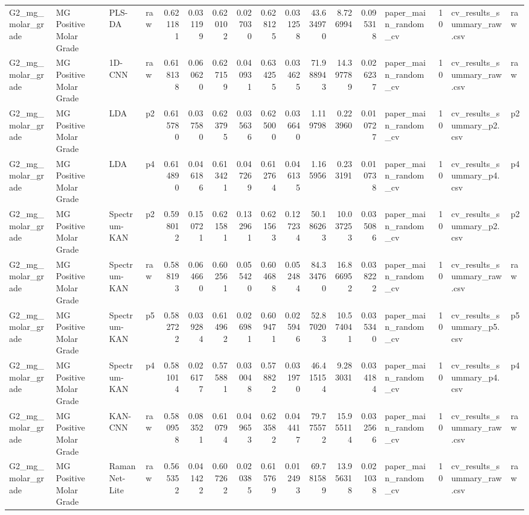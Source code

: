 \begin{tabular}{llllrrrrrrrrrlrll}
G2_mg_molar_grade & MG Positive Molar Grade & PLS-DA & raw & 0.621181 & 0.031199 & 0.620102 & 0.027030 & 0.628125 & 0.031258 & 43.634970 & 8.726994 & 0.095318 & paper_main_random_cv & 10 & cv_results_summary_raw.csv & raw \\
G2_mg_molar_grade & MG Positive Molar Grade & 1D-CNN & raw & 0.618138 & 0.060620 & 0.627159 & 0.040931 & 0.634255 & 0.034625 & 71.988943 & 14.397789 & 0.026237 & paper_main_random_cv & 10 & cv_results_summary_raw.csv & raw \\
G2_mg_molar_grade & MG Positive Molar Grade & LDA & p2 & 0.615780 & 0.037580 & 0.623795 & 0.035636 & 0.625000 & 0.036640 & 1.119798 & 0.223960 & 0.010727 & paper_main_random_cv & 10 & cv_results_summary_p2.csv & p2 \\
G2_mg_molar_grade & MG Positive Molar Grade & LDA & p4 & 0.614890 & 0.046186 & 0.613421 & 0.047269 & 0.612764 & 0.046135 & 1.165956 & 0.233191 & 0.010738 & paper_main_random_cv & 10 & cv_results_summary_p4.csv & p4 \\
G2_mg_molar_grade & MG Positive Molar Grade & Spectrum-KAN & p2 & 0.598012 & 0.150721 & 0.621581 & 0.132961 & 0.621563 & 0.127234 & 50.186263 & 10.037253 & 0.035086 & paper_main_random_cv & 10 & cv_results_summary_p2.csv & p2 \\
G2_mg_molar_grade & MG Positive Molar Grade & Spectrum-KAN & raw & 0.588193 & 0.064660 & 0.602561 & 0.055420 & 0.604688 & 0.052484 & 84.334760 & 16.866952 & 0.038222 & paper_main_random_cv & 10 & cv_results_summary_raw.csv & raw \\
G2_mg_molar_grade & MG Positive Molar Grade & Spectrum-KAN & p5 & 0.582722 & 0.039284 & 0.614962 & 0.026981 & 0.609471 & 0.025946 & 52.870203 & 10.574041 & 0.035340 & paper_main_random_cv & 10 & cv_results_summary_p5.csv & p5 \\
G2_mg_molar_grade & MG Positive Molar Grade & Spectrum-KAN & p4 & 0.581014 & 0.026177 & 0.575881 & 0.030048 & 0.578822 & 0.031970 & 46.415154 & 9.283031 & 0.034184 & paper_main_random_cv & 10 & cv_results_summary_p4.csv & p4 \\
G2_mg_molar_grade & MG Positive Molar Grade & KAN-CNN & raw & 0.580958 & 0.083521 & 0.610794 & 0.049653 & 0.623582 & 0.044417 & 79.775572 & 15.955114 & 0.032566 & paper_main_random_cv & 10 & cv_results_summary_raw.csv & raw \\
G2_mg_molar_grade & MG Positive Molar Grade & RamanNet-Lite & raw & 0.565352 & 0.041422 & 0.607262 & 0.020385 & 0.615769 & 0.012493 & 69.781589 & 13.956318 & 0.021038 & paper_main_random_cv & 10 & cv_results_summary_raw.csv & raw \\

\end{tabular}

